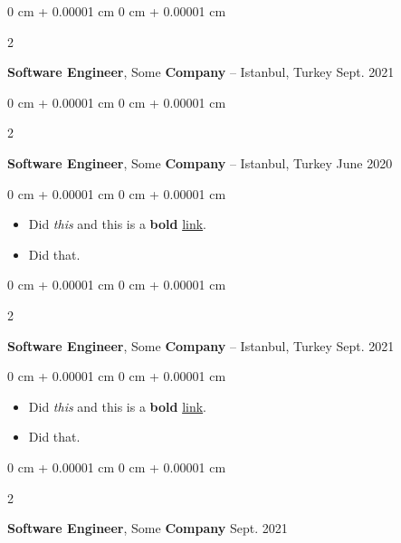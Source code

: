 \documentclass[10pt, letterpaper]{article}
\newenvironment{highlights}{
    \begin{itemize}[
        topsep=0.10 cm,
        parsep=0.10 cm,
        partopsep=0pt,
        itemsep=0pt,
        leftmargin=0 cm + 10pt
    ]
}{
    \end{itemize}
} %
\newenvironment{onecolentry}{
    \begin{adjustwidth}{
        0 cm + 0.00001 cm
    }{
        0 cm + 0.00001 cm
    }
}{
    \end{adjustwidth}
} %
\newenvironment{twocolentry}[2][]{
    \onecolentry
    \def\secondColumn{#2}
    \setcolumnwidth{\fill, 4.5 cm}
    \begin{paracol}{2}
}{
    \switchcolumn \raggedleft \secondColumn
    \end{paracol}
    \endonecolentry
} %
\begin{document}
        \vspace{0.2 cm}

        \begin{twocolentry}{
            Sept. 2021
        }
            \textbf{Software Engineer}, Some \textbf{Company} -- Istanbul, Turkey\end{twocolentry}



        \vspace{0.2 cm}

        \begin{twocolentry}{
            June 2020
        }
            \textbf{Software Engineer}, Some \textbf{Company} -- Istanbul, Turkey\end{twocolentry}

        \vspace{0.10 cm}
        \begin{onecolentry}
            \begin{highlights}
                \item Did \textit{this} and this is a \textbf{bold} \href{https://example.com}{link}.
                \item Did that.
            \end{highlights}
        \end{onecolentry}


        \vspace{0.2 cm}

        \begin{twocolentry}{
            Sept. 2021
        }
            \textbf{Software Engineer}, Some \textbf{Company} -- Istanbul, Turkey\end{twocolentry}

        \vspace{0.10 cm}
        \begin{onecolentry}
            \begin{highlights}
                \item Did \textit{this} and this is a \textbf{bold} \href{https://example.com}{link}.
                \item Did that.
            \end{highlights}
        \end{onecolentry}


        \vspace{0.2 cm}

        \begin{twocolentry}{
            Sept. 2021
        }
            \textbf{Software Engineer}, Some \textbf{Company}\end{twocolentry}
\end{document}
